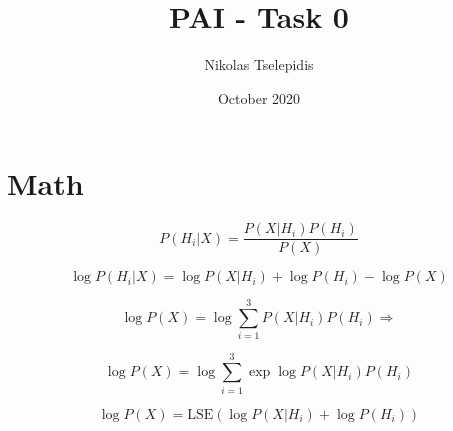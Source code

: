 \documentclass{article}
\title{PAI - Task 0}
\author{Nikolas Tselepidis}
\date{October 2020}
\begin{document}
\maketitle

\section{Math}

\begin{equation}
    P(H_i | X) = \frac{ P(X | H_i) P(H_i) }{ P(X) }
\end{equation}

\begin{equation}
    \log{ P(H_i | X) } = \log{ P(X | H_i) } + \log{ P(H_i) } - \log{ P(X) }
\end{equation}

\begin{equation}
    \log{ P(X) } = \log{ \sum_{i = 1}^{3} P(X | H_i) P(H_i) } \Rightarrow
\end{equation}

\begin{equation}
    \log{ P(X) } = \log{ \sum_{i = 1}^{3} \exp{ \log{ P(X | H_i) P(H_i) } } }
\end{equation}

\begin{equation}
    \log{ P(X) } = \text{LSE} \left( \log{ P(X | H_i) } + \log{ P(H_i) } \right)
\end{equation}
\end{document}
